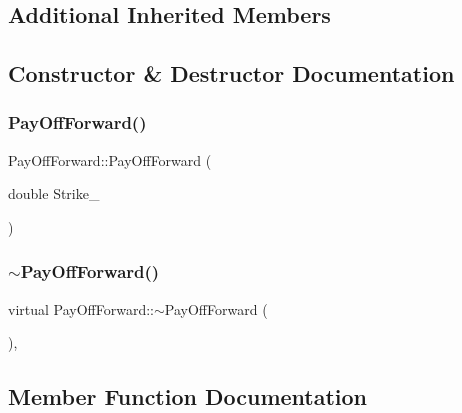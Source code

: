 \subsection*{Additional Inherited Members}


\subsection{Constructor \& Destructor Documentation}
\hypertarget{classPayOffForward_adde9bc6ed466bd16d89d92182fd63847}{}\label{classPayOffForward_adde9bc6ed466bd16d89d92182fd63847} 
\subsubsection{\texorpdfstring{Pay\+Off\+Forward()}{PayOffForward()}}
{\footnotesize\ttfamily Pay\+Off\+Forward\+::\+Pay\+Off\+Forward (\begin{DoxyParamCaption}\item[{double}]{Strike\+\_\+ }\end{DoxyParamCaption})}

\hypertarget{classPayOffForward_a638b856552b79d138c2b685fbebf086e}{}\label{classPayOffForward_a638b856552b79d138c2b685fbebf086e} 
\subsubsection{\texorpdfstring{$\sim$\+Pay\+Off\+Forward()}{~PayOffForward()}}
{\footnotesize\ttfamily virtual Pay\+Off\+Forward\+::$\sim$\+Pay\+Off\+Forward (\begin{DoxyParamCaption}{ }\end{DoxyParamCaption})\hspace{0.3cm}{\ttfamily [inline]}, {\ttfamily [virtual]}}



\subsection{Member Function Documentation}
\hypertarget{classPayOffForward_aca37e8270f086f8e55ff9fd1038d64b4}{}\label{classPayOffForward_aca37e8270f086f8e55ff9fd1038d64b4} 
